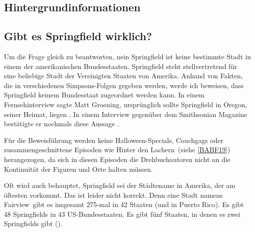 \begin{appendix}

\chapter{Hintergrundinformationen}

\section{Gibt es Springfield wirklich?}\label{ExistiertSpringfield}
Um die Frage gleich zu beantworten, nein Springfield ist keine bestimmte Stadt in einem der amerikanischen Bundesstaaten. Springfield steht stellvertretend für eine beliebige Stadt der Vereinigten Staaten von Amerika. Anhand von Fakten, die in verschiedenen Simpsons-Folgen gegeben werden, werde ich beweisen, dass Springfield keinem Bundesstaat zugeordnet werden kann. In einem Fernsehinterview sagte Matt Groening, ursprünglich sollte Springfield in Oregon, seiner Heimat, liegen \cite{InterviewGroening}. In einem Interview gegenüber dem Smithsonian Magazine bestätigte er nochmals diese Aussage \cite{Smithsonian}.

Für die Beweisführung werden keine Halloween-Specials, Couchgags oder zusammengeschnittene Episoden wie \glqq Hinter den Lachern\grqq\ (siehe \ref{BABF19}) herangezogen, da sich in diesen Episoden die Drehbuchautoren nicht an die Kontinuität der Figuren und Orte halten müssen.

Oft wird auch behauptet, Springfield sei der Städtename in Amerika, der am öftesten vorkommt. Das ist leider nicht korrekt. Denn eine Stadt namens \glqq Fairview\grqq\ gibt es insgesamt 275-mal in 42 Staaten (und in Puerto Rico). Es gibt 48 Springfields in 43 US-Bundesstaaten. Es gibt fünf Staaten, in denen es zwei Springfields gibt (\cite{Reiss19}).


\end{appendix}
